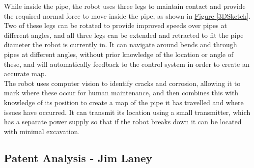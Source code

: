 \documentclass[11pt]{article}		%
\newcommand{\figref}[1]{\hyperref[#1]{Figure \ref*{#1}}}    %
\begin{document}
		While inside the pipe, the robot uses three legs to maintain contact and provide the required normal force to move inside the pipe, as shown in \figref{3DSketch}.
		Two of these legs can be rotated to provide improved speeds over pipes at different angles, and all three legs can be extended and retracted to fit the pipe diameter the robot is currently in.
		It can navigate around bends and through pipes at different angles, without prior knowledge of the location or angle of these, and will automatically feedback to the control system in order to create an accurate map.
		\\
		The robot uses computer vision to identify cracks and corrosion, allowing it to mark where these occur for human maintenance, and then combines this with knowledge of its position to create a map of the pipe it has travelled and where issues have occurred.
		It can transmit its location using a small transmitter, which has a separate power supply so that if the robot breaks down it can be located with minimal excavation.
	
	\subsection[Patent Analysis]{Patent Analysis - Jim Laney}
\end{document}
